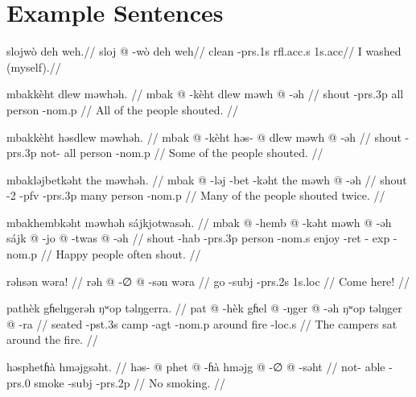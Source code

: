 \section{Example Sentences}

\ex
\begingl
\glpreamble slojwò deh weh.//
\gla sloj @ -wò deh weh//
\glb clean -{\sc prs}.1s {\sc rfl}.{\sc acc}.s 1s.{\sc acc}//
\glft I washed (myself).//
\endgl
\xe

\pex
\a
\begingl
\glpreamble mbakkèht dlew məwhəh. //
\gla mbak @ -kèht dlew məwh @ -əh //
\glb shout -{\sc prs}.3p all person -{\sc nom}.p //
\glft All of the people shouted. //
\endgl

\a
\begingl
\glpreamble mbakkèht həsdlew məwhəh. //
\gla mbak @ -kèht həs- @ dlew məwh @ -əh //
\glb shout -{\sc prs}.3p not- all person -{\sc nom}.p //
\glft Some of the people shouted. //
\endgl

\a
\begingl
\glpreamble mbakləjbetkəht the məwhəh. //
\gla mbak @ -ləj -bet -kəht the məwh @ -əh //
\glb shout -2 -{\sc pfv} -{\sc prs}.3p many person -{\sc nom}.p //
\glft Many of the people shouted twice. //
\endgl

\a
\begingl
\glpreamble mbakhembkəht məwhəh sájkjotwasəh. //
\gla mbak @ -hemb @ -kəht məwh @ -əh sájk @ -jo @ -twas @ -əh //
\glb shout -{\sc hab} -{\sc prs}.3p person -{\sc nom}.s enjoy -{\sc ret} -{\sc
exp} -{\sc nom}.p //
\glft Happy people often shout. //
\endgl
\xe

\ex
\begingl
\glpreamble rəhsən wəra! //
\gla rəh @ -∅ @ -sən wəra //
\glb go -{\sc subj} -{\sc prs}.2s 1s.{\sc loc} //
\glft Come here! //
\endgl
\xe

\ex
\begingl
\glpreamble pathèk gɦelŋgerəh ŋʷop təlŋgerra. //
\gla pat @ -hèk gɦel @ -ŋger @ -əh ŋʷop təlŋger @ -ra //
\glb seated -{\sc pst}.3s camp -{\sc agt} -{\sc nom}.p around fire -{\sc loc}.s
//
\glft The campers sat around the fire. //
\endgl
\xe

\ex
\begingl
    \glpreamble həsphetɦà hməjgsəht. //
    \gla həs- @ phet @ -ɦà hməjg @ -∅ @ -səht //
    \glb not- able -{\sc prs}.0 smoke -{\sc subj} -{\sc prs}.2p //
    \glft No smoking. //
\endgl
\xe
